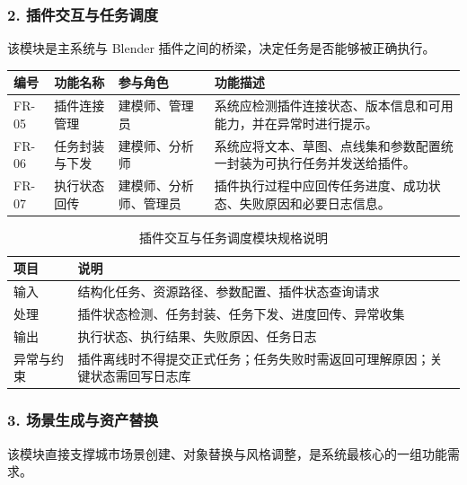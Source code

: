 \documentclass[UTF8,a4paper,10pt]{ctexart}
\begin{document}
\subsubsection*{2. 插件交互与任务调度}
该模块是主系统与 Blender 插件之间的桥梁，决定任务是否能够被正确执行。
{
\renewcommand{\arraystretch}{1.35}

\begin{longtable}{p{1.8cm} p{2.5cm} p{2.1cm} p{6.4cm}}
\toprule
\rowcolor{gray!20}
编号 & 功能名称 & 参与角色 & 功能描述 \\
\midrule
FR-05 & 插件连接管理 & 建模师、管理员 & 系统应检测插件连接状态、版本信息和可用能力，并在异常时进行提示。 \\
FR-06 & 任务封装与下发 & 建模师、分析师 & 系统应将文本、草图、点线集和参数配置统一封装为可执行任务并发送给插件。 \\
FR-07 & 执行状态回传 & 建模师、分析师、管理员 & 插件执行过程中应回传任务进度、成功状态、失败原因和必要日志信息。 \\
\bottomrule
\end{longtable}
}

{
\renewcommand{\arraystretch}{1.3}

\begin{table}[H]
\centering
\caption{插件交互与任务调度模块规格说明}
\begin{tabularx}{\textwidth}{p{2.6cm} Y}
\toprule
{}
项目 & 说明 \\
\midrule
输入 & 结构化任务、资源路径、参数配置、插件状态查询请求 \\
处理 & 插件状态检测、任务封装、任务下发、进度回传、异常收集 \\
输出 & 执行状态、执行结果、失败原因、任务日志 \\
异常与约束 & 插件离线时不得提交正式任务；任务失败时需返回可理解原因；关键状态需回写日志库 \\
\bottomrule
\end{tabularx}
\end{table}
}

\subsubsection*{3. 场景生成与资产替换}
该模块直接支撑城市场景创建、对象替换与风格调整，是系统最核心的一组功能需求。
\end{document}
